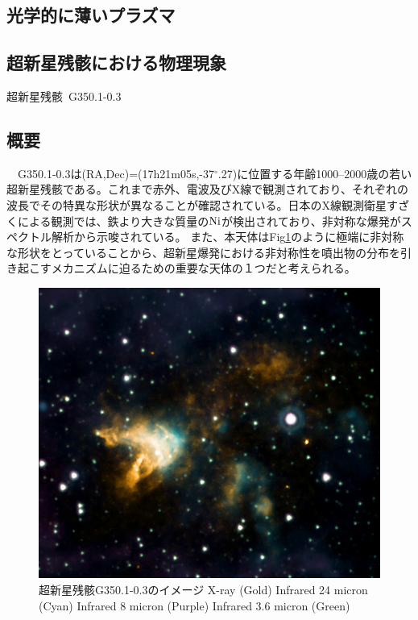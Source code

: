 \documentclass[a4j]{jarticle}%
\makeatletter
\def\section{\@startsection {section}{1}{\z@}
{\ifnum \c@section = 0
0.0ex plus
\else
-2.0ex plus 
\fi
 -1ex minus -.2ex}
{0.3ex plus .2ex}{\reset@font\fontsize{14pt}{0pt}\gtfamily\sffamily}}%
\makeatother
\begin{document}
\subsection{光学的に薄いプラズマ}

\subsection{超新星残骸における物理現象}

\newpage
\section{超新星残骸~G350.1-0.3}
\subsection{概要}
　G350.1-0.3は(RA,Dec)=(17h21m05s,-37$^\circ$.27)に位置する年齢1000--2000歳の若い超新星残骸である。これまで赤外、電波及びX線で観測されており、それぞれの波長でその特異な形状が異なることが確認されている。日本のX線観測衛星すざくによる観測\cite{Yasumi2014}では、鉄より大きな質量の$\rm{Ni}$が検出されており、非対称な爆発がスペクトル解析から示唆されている。
また、本天体はFig\ref{fig:g350_cxc}のように極端に非対称な形状をとっていることから、超新星爆発における非対称性を噴出物の分布を引き起こすメカニズムに迫るための重要な天体の１つだと考えられる。

\begin{figure}[H]
  \begin{center}
  \includegraphics[scale=0.4]{./g350_hand.jpg}
  \caption{超新星残骸G350.1-0.3のイメージ \protect\newline X-ray (Gold) Infrared 24 micron (Cyan) Infrared 8 micron (Purple) Infrared 3.6 micron (Green)}
  \label{fig:g350_cxc}
  \end{center}
  \end{figure}
\end{document}
